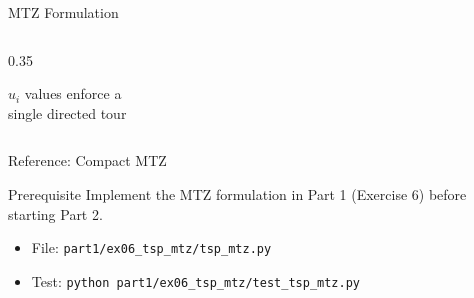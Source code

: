\documentclass[aspectratio=169]{beamer}
\begin{document}
\begin{frame}{MTZ Formulation}
\begin{columns}[T]
\begin{column}{0.35\textwidth}

\smallskip
{\scriptsize $u_i$ values enforce a\\ single directed tour}
\end{column}
\end{columns}
\end{frame}

\begin{frame}{Reference: Compact MTZ}
\begin{block}{Prerequisite}
Implement the MTZ formulation in Part 1 (Exercise 6) before starting Part 2.
\end{block}
\begin{itemize}
  \item File: \texttt{part1/ex06\_tsp\_mtz/tsp\_mtz.py}
  \item Test: \texttt{python part1/ex06\_tsp\_mtz/test\_tsp\_mtz.py}
\end{itemize}
\end{frame}
\end{document}
